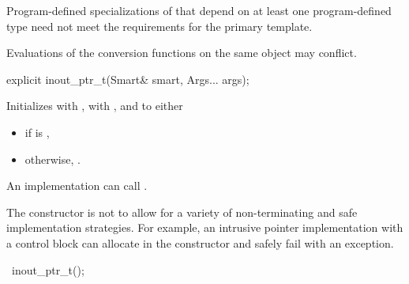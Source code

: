 \pnum
Program-defined specializations of 
that depend on at least one program-defined type
need not meet the requirements for the primary template.

\pnum
Evaluations of the conversion functions on the same object
may conflict.

%
\begin{itemdecl}
explicit inout_ptr_t(Smart& smart, Args... args);
\end{itemdecl}

\begin{itemdescr}
\pnum
\effects
Initializes  with ,
 with , and
 to either
\begin{itemize}
\item {} if  is ,
\item otherwise, .
\end{itemize}

\pnum
\remarks
An implementation can call .

\pnum
\begin{note}
The constructor is not 
to allow for a variety of non-terminating and safe implementation strategies.
For example, an intrusive pointer implementation with a control block
can allocate in the constructor and safely fail with an exception.
\end{note}
\end{itemdescr}

%
\begin{itemdecl}
~inout_ptr_t();
\end{itemdecl}


